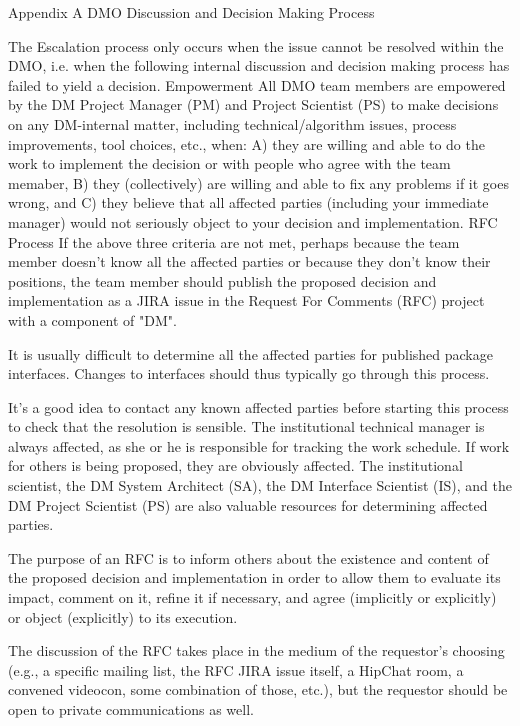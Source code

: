 \begin{itemize}
Appendix A DMO Discussion and Decision Making Process

The Escalation process only occurs when the issue cannot be resolved within the DMO, i.e. when the following internal discussion and decision making process has failed to yield a decision.
Empowerment
All DMO team members are empowered by the DM Project Manager (PM) and Project Scientist (PS) to make decisions on any DM-internal matter, including technical/algorithm issues, process improvements, tool choices, etc., when:
A) they are willing and able to do the work to implement the decision or with people who agree with the team memaber,
B) they (collectively) are willing and able to fix any problems if it goes wrong, and
C) they believe that all affected parties (including your immediate manager) would not seriously object to your decision and implementation.
RFC Process
If the above three criteria are not met, perhaps because the team member doesn't know all the affected parties or because they don't know their positions, the team member should publish the proposed decision and implementation as a JIRA issue in the Request For Comments (RFC) project with a component of "DM".

It is usually difficult to determine all the affected parties for published package interfaces. Changes to interfaces should thus typically go through this process.

It's a good idea to contact any known affected parties before starting this process to check that the resolution is sensible. The institutional technical manager is always affected, as she or he is responsible for tracking the work schedule. If work for others is being proposed, they are obviously affected. The institutional scientist, the DM System Architect (SA), the DM Interface Scientist (IS), and the DM Project Scientist (PS) are also valuable resources for determining affected parties.

The purpose of an RFC is to inform others about the existence and content of the proposed decision and implementation in order to allow them to evaluate its impact, comment on it, refine it if necessary, and agree (implicitly or explicitly) or object (explicitly) to its execution.

The discussion of the RFC takes place in the medium of the requestor's choosing (e.g., a specific mailing list, the RFC JIRA issue itself, a HipChat room, a convened videocon, some combination of those, etc.), but the requestor should be open to private communications as well.


\end{itemize}
